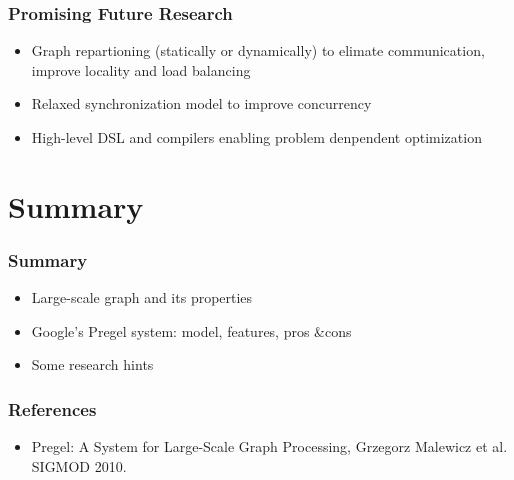 \documentclass[]{beamer}
\begin{document}
\begin{frame}
  \frametitle{Promising Future Research}
  \begin{itemize}
    \item Graph repartioning (statically or dynamically) to elimate communication, improve locality and
      load balancing
    \item Relaxed synchronization model to improve concurrency
    \item High-level DSL and compilers enabling problem denpendent optimization
  \end{itemize}
\end{frame}

\section{Summary}
\frame{\tableofcontents[currentsection]}

\begin{frame}
  \frametitle{Summary}
  \begin{itemize}
    \item Large-scale graph and its properties
    \item Google's Pregel system: model, features, pros \&cons
    \item Some research hints
  \end{itemize}
\end{frame}

\begin{frame}
  \frametitle{References}
  \begin{itemize}
    \item Pregel: A System for Large-Scale Graph Processing, Grzegorz Malewicz et al. SIGMOD 2010.
  \end{itemize}
\end{frame}

\end{document}
